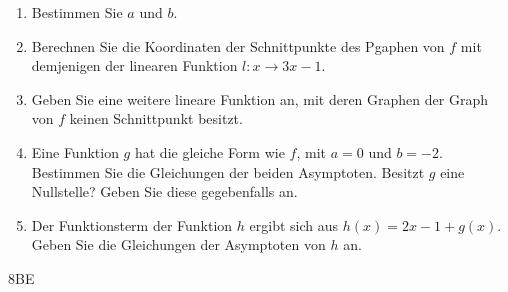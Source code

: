\documentclass[a4paper,12pt]{article}
\begin{document}
    \begin{enumerate}[label={\alph*)}]
         \item Bestimmen Sie $a$ und $b$.
         \item Berechnen Sie die Koordinaten der Schnittpunkte des Pgaphen von $f$ mit demjenigen der linearen Funktion $l:x\rightarrow3x-1$.
         \item Geben Sie eine weitere lineare Funktion an, mit deren Graphen der Graph von $f$ keinen Schnittpunkt besitzt.
         \item Eine Funktion $g$ hat die gleiche Form wie $f$, mit $a=0$ und $b=-2$. Bestimmen Sie die Gleichungen der beiden Asymptoten. Besitzt $g$ eine Nullstelle? Geben Sie diese gegebenfalls an.
         \item Der Funktionsterm der Funktion $h$ ergibt sich aus $h(x)=2x-1+g(x)$. Geben Sie die Gleichungen der Asymptoten von $h$ an.
      \end{enumerate}


\begin{flushright}8BE \end{flushright}

\end{document}
